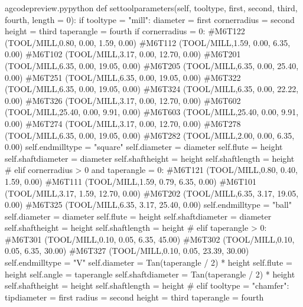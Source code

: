 \documentclass{ltxdoc}
\begin{document}
\lstset{firstnumber=\thegcpy}
\begin{writecode}{a}{gcodepreview.py}{python}
    def settoolparameters(self, tooltype, first, second, third, fourth, length = 0):
        if tooltype = "mill":
            diameter = first
            cornerradius = second
            height = third
            taperangle = fourth
            if cornerradius = 0:
#M6T122 (TOOL/MILL,0.80, 0.00, 1.59, 0.00)
#M6T112 (TOOL/MILL,1.59, 0.00, 6.35, 0.00)
#M6T102 (TOOL/MILL,3.17, 0.00, 12.70, 0.00)
#M6T201 (TOOL/MILL,6.35, 0.00, 19.05, 0.00)
#M6T205 (TOOL/MILL,6.35, 0.00, 25.40, 0.00)
#M6T251 (TOOL/MILL,6.35, 0.00, 19.05, 0.00)
#M6T322 (TOOL/MILL,6.35, 0.00, 19.05, 0.00)
#M6T324 (TOOL/MILL,6.35, 0.00, 22.22, 0.00)
#M6T326 (TOOL/MILL,3.17, 0.00, 12.70, 0.00)
#M6T602 (TOOL/MILL,25.40, 0.00, 9.91, 0.00)
#M6T603 (TOOL/MILL,25.40, 0.00, 9.91, 0.00)
#M6T274 (TOOL/MILL,3.17, 0.00, 12.70, 0.00)
#M6T278 (TOOL/MILL,6.35, 0.00, 19.05, 0.00)
#M6T282 (TOOL/MILL,2.00, 0.00, 6.35, 0.00)
            self.endmilltype = "square"
            self.diameter = diameter
            self.flute = height
            self.shaftdiameter = diameter
            self.shaftheight = height
            self.shaftlength = height
#
            elif cornerradius > 0 and taperangle = 0:
#M6T121 (TOOL/MILL,0.80, 0.40, 1.59, 0.00)
#M6T111 (TOOL/MILL,1.59, 0.79, 6.35, 0.00)
#M6T101 (TOOL/MILL,3.17, 1.59, 12.70, 0.00)
#M6T202 (TOOL/MILL,6.35, 3.17, 19.05, 0.00)
#M6T325 (TOOL/MILL,6.35, 3.17, 25.40, 0.00)
            self.endmilltype = "ball"
            self.diameter = diameter
            self.flute = height
            self.shaftdiameter = diameter
            self.shaftheight = height
            self.shaftlength = height
#
            elif taperangle > 0:
#M6T301 (TOOL/MILL,0.10, 0.05, 6.35, 45.00)
#M6T302 (TOOL/MILL,0.10, 0.05, 6.35, 30.00)
#M6T327 (TOOL/MILL,0.10, 0.05, 23.39, 30.00)
            self.endmilltype = "V"
            self.diameter = Tan(taperangle / 2) * height
            self.flute = height
            self.angle = taperangle
            self.shaftdiameter = Tan(taperangle / 2) * height 
            self.shaftheight = height
            self.shaftlength = height
#
        elif tooltype = "chamfer":
            tipdiameter = first
            radius = second
            height = third
            taperangle = fourth

\end{writecode}
\addtocounter{gcpy}{7}

\begin{verbatim}

\end{verbatim}
\end{document}
